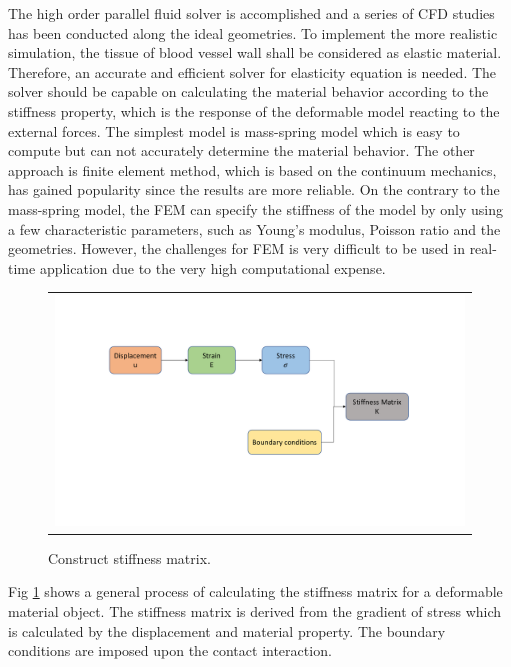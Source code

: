 The high order parallel fluid solver \cite{liang2007large, liang2007large, liang2009effect} is accomplished and a series of CFD studies has been conducted along the ideal geometries. To implement the more realistic simulation, the tissue of blood vessel wall shall be considered as elastic material. Therefore, an accurate and efficient solver for elasticity equation is needed. The solver should be capable on calculating the material behavior according to the stiffness property, which is the response of the deformable model reacting to the external forces. The simplest model is mass-spring model which is easy to compute but can not accurately determine the material behavior. The other approach is finite element method, which is based on the continuum mechanics, has gained popularity since the results are more reliable. On the contrary to the mass-spring model, the FEM can specify the stiffness of the model by only using a few characteristic parameters, such as Young's modulus, Poisson ratio and the geometries. However, the challenges for FEM is very difficult to be used in real-time application due to the very high computational expense. 

\begin{figure}[H]
	\centering
	\begin{tabular}{c}
		\includegraphics[width=1.0\textwidth]{./pics/construct_matrix}
	\end{tabular}
	\caption{\footnotesize Construct stiffness matrix.} \label{fig: ch1f2}
\end{figure}

Fig \ref{fig: ch1f2} shows a general process of calculating the stiffness matrix for a deformable material object. The stiffness matrix is derived from the gradient of stress which is calculated by the displacement and material property. The boundary conditions are imposed upon the contact interaction.


